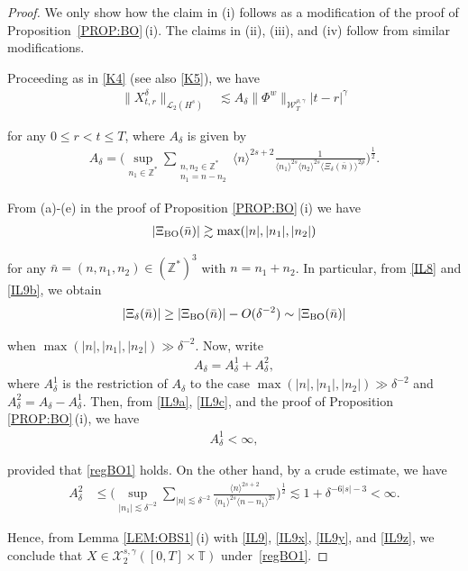 \documentclass[letterpaper, 11pt,  reqno]{amsart}
\newcommand{\1}{\hspace{0.5mm}\text{I}\hspace{0.5mm}}
\newcommand{\noi}{\noindent}
\newcommand{\Z}{\mathbb{Z}}
\newcommand{\T}{\mathbb{T}}
\newcommand{\dl}{\delta}
\newcommand{\g}{\gamma}
\newcommand{\les}{\lesssim}
\newcommand{\ges}{\gtrsim}
\newcommand{\jb}[1]
{\langle #1 \rangle}
\newcommand{\cL}{\mathcal{L}}
\newcommand{\cX}{\mathcal{X}}
\newcommand{\W}{\mathcal{W}}
\newcommand{\BO}{\text{\rm BO} }
\numberwithin{equation}{section}
\numberwithin{theorem}{section}
\begin{document}
 \begin{proof}
 We only show how the claim in  (i) 
 follows as a modification of the proof of 
 Proposition~\ref{PROP:BO}\,(i).
 The claims in (ii), (iii), and (iv) follow from 
 similar modifications. 

 Proceeding as in \eqref{K4} (see also  \eqref{K5}), 
we have 
\begin{align}
\|X^\dl_{t,r} \|_{\cL_2 (H^s)}
&\les
A_\dl \| \Phi^w \|_{\W_T^{\rho,\g}} 
  |t-r|^{\g}
\label{IL9}
\end{align}

\noi
\noi
for any $0 \le r <  t \le T$, 
where $A_\dl$ is given by
\begin{align}
A_\dl = \bigg(\sup_{n_1 \in \Z^*}
\sum_{\substack{n, n_2 \in \Z^*\\n_1 = n - n_2}} 
 \jb{n}^{2s + 2}
 \frac{1}{\jb{n_1}^{2s} \jb{n_2}^{2s} \jb{  \Xi_\dl (\bar n)}^{2\rho}}\bigg)^\frac 12.
\label{IL9a}
\end{align}


 From (a)-(e) in the proof of Proposition \ref{PROP:BO}\,(i)
 we have
 \begin{align}
 |\Xi_\BO(\bar n)| \ges \max (|n|, |n_1|, |n_2|)
\label{IL9b}
 \end{align} 
 
 \noi
 for any $\bar n = (n, n_1, n_2) \in (\Z^*)^3$
 with $n = n_1 + n_2$.
 In particular, from \eqref{IL8} and \eqref{IL9b}, 
 we obtain
 \begin{align}
|\Xi_\dl(\bar n)| \ge   |\Xi_\BO(\bar n)| -  O(\dl^{-2})
\sim  |\Xi_\BO(\bar n)|
\label{IL9c}
\end{align}


\noi
 when 
$ \max (|n|, |n_1|, |n_2|) \gg \dl^{-2}$.
Now, write 
\begin{align}
A_\dl = A_\dl^1 + A_\dl^2,
\label{IL9x} 
\end{align}
where
$A_\dl^1$ is the restriction 
of $A_\dl$ to the case 
$ \max (|n|, |n_1|, |n_2|) \gg \dl^{-2}$
and $A_\dl^2 = A_\dl - A_\dl^1$.
 Then, from \eqref{IL9a}, \eqref{IL9c}, 
 and
 the proof of Proposition \ref{PROP:BO}\,(i), 
 we have 
\begin{align}
A_\dl^1 < \infty, 
\label{IL9y}
\end{align}

\noi
 provided that \eqref{regBO1} holds.
 On the other hand, by a crude estimate, 
 we have 
 \begin{align}
A_\dl^2 
& \le  \bigg(\sup_{|n_1|\les \dl^{-2}}
\sum_{|n|\les \dl^{-2} }
 \frac{\jb{n}^{2s + 2}}{\jb{n_1}^{2s} \jb{n - n_1}^{2s} }\bigg)^\frac 12
 \les 1 + \dl^{-6|s| - 3} < \infty.
\label{IL9z}
\end{align}

\noi
Hence,
from  Lemma \ref{LEM:OBS1}\,(i)
with \eqref{IL9}, 
 \eqref{IL9x},  \eqref{IL9y}, and  \eqref{IL9z}, 
we conclude that 
 $X\in  \cX^{s, \g}_2([0, T]\times \T)$ under~\eqref{regBO1}.
 \end{proof}
\end{document}
